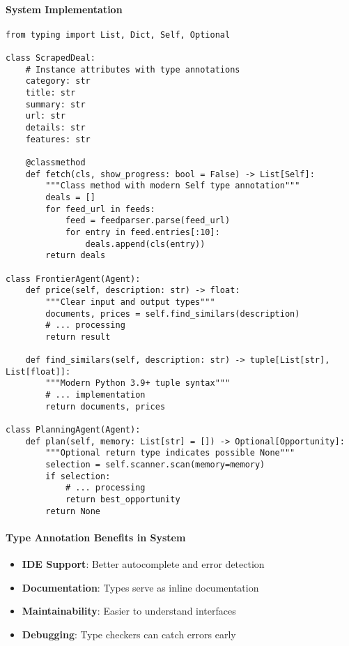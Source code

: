 \paragraph{System Implementation}
\begin{lstlisting}[caption=System Type Annotations]
from typing import List, Dict, Self, Optional

class ScrapedDeal:
    # Instance attributes with type annotations
    category: str
    title: str
    summary: str
    url: str
    details: str
    features: str

    @classmethod
    def fetch(cls, show_progress: bool = False) -> List[Self]:
        """Class method with modern Self type annotation"""
        deals = []
        for feed_url in feeds:
            feed = feedparser.parse(feed_url)
            for entry in feed.entries[:10]:
                deals.append(cls(entry))
        return deals

class FrontierAgent(Agent):
    def price(self, description: str) -> float:
        """Clear input and output types"""
        documents, prices = self.find_similars(description)
        # ... processing
        return result
        
    def find_similars(self, description: str) -> tuple[List[str], List[float]]:
        """Modern Python 3.9+ tuple syntax"""
        # ... implementation
        return documents, prices

class PlanningAgent(Agent):
    def plan(self, memory: List[str] = []) -> Optional[Opportunity]:
        """Optional return type indicates possible None"""
        selection = self.scanner.scan(memory=memory)
        if selection:
            # ... processing
            return best_opportunity
        return None
\end{lstlisting}

\paragraph{Type Annotation Benefits in System}
\begin{itemize}
\item \textbf{IDE Support}: Better autocomplete and error detection
\item \textbf{Documentation}: Types serve as inline documentation
\item \textbf{Maintainability}: Easier to understand interfaces
\item \textbf{Debugging}: Type checkers can catch errors early
\end{itemize}

